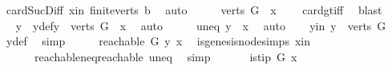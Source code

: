 \begin{isabellebody}
\ card{\isacharunderscore}{\kern0pt}Suc{\isacharunderscore}{\kern0pt}Diff{}\ x{\isacharunderscore}{\kern0pt}in\ finite{\isacharunderscore}{\kern0pt}verts\ b{}\ \isamarkupfalse%
\ auto\isanewline
\ \ \isamarkupfalse%
\ \isamarkupfalse%
\ {\isachardoublequoteopen}{\isacharparenleft}{\kern0pt}{\isacharparenleft}{\kern0pt}verts\ G{\isacharparenright}{\kern0pt}\ {\isacharminus}{\kern0pt}\ {\isacharbraceleft}{\kern0pt}x{\isacharbraceright}{\kern0pt}{\isacharparenright}{\kern0pt}\ {\isasymnoteq}\ {\isacharbraceleft}{\kern0pt}{\isacharbraceright}{\kern0pt}{\isachardoublequoteclose}\ \isamarkupfalse%
\ card{\isacharunderscore}{\kern0pt}gt{\isacharunderscore}{\kern0pt}{}{\isacharunderscore}{\kern0pt}iff\ \isamarkupfalse%
\ blast\isanewline
\ \ \isamarkupfalse%
\ \isamarkupfalse%
\ y\ \ y{\isacharunderscore}{\kern0pt}def{\isacharcolon}{\kern0pt}{\isachardoublequoteopen}y\ {\isasymin}\ {\isacharparenleft}{\kern0pt}verts\ G{\isacharparenright}{\kern0pt}\ {\isacharminus}{\kern0pt}\ {\isacharbraceleft}{\kern0pt}x{\isacharbraceright}{\kern0pt}{\isachardoublequoteclose}\ \isamarkupfalse%
\ auto\isanewline
\ \ \isamarkupfalse%
\ \isamarkupfalse%
\ uneq{\isacharcolon}{\kern0pt}\ {\isachardoublequoteopen}y\ {\isasymnoteq}\ x{\isachardoublequoteclose}\ \isamarkupfalse%
\ auto\isanewline
\ \ \isamarkupfalse%
\ y{\isacharunderscore}{\kern0pt}in{\isacharcolon}{\kern0pt}\ {\isachardoublequoteopen}y\ {\isasymin}\ {\isacharparenleft}{\kern0pt}verts\ G{\isacharparenright}{\kern0pt}{\isachardoublequoteclose}\ \isamarkupfalse%
\ y{\isacharunderscore}{\kern0pt}def\ \isamarkupfalse%
\ simp\isanewline
\ \ \isamarkupfalse%
\ \isamarkupfalse%
\ {\isachardoublequoteopen}reachable{}\ G\ y\ x{\isachardoublequoteclose}\ \isamarkupfalse%
\ is{\isacharunderscore}{\kern0pt}genesis{\isacharunderscore}{\kern0pt}node{\isachardot}{\kern0pt}simps\ x{\isacharunderscore}{\kern0pt}in\isanewline
\ \ \ \ \ \ reachable{\isacharunderscore}{\kern0pt}neq{\isacharunderscore}{\kern0pt}reachable{}\ uneq\ \isamarkupfalse%
\ simp\isanewline
\ \ \isamarkupfalse%
\ \isamarkupfalse%
\ {\isachardoublequoteopen}{\isasymnot}\ is{\isacharunderscore}{\kern0pt}tip\ G\ x{\isachardoublequoteclose}\isanewline
\ \ \ \ \isamarkupfalse%

\end{isabellebody}
